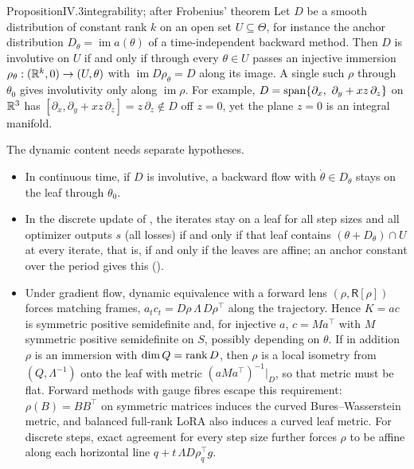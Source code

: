 \begin{restate}{Proposition}{IV.3}{integrability; after Frobenius' theorem}
Let $D$ be a smooth distribution of constant rank $k$ on an open set $U\subseteq\Theta$, for instance the anchor
distribution $D_\theta=\operatorname{im}a(\theta)$ of a time-independent backward method. Then $D$ is involutive on $U$ if
and only if through every $\theta\in U$ passes an injective immersion $\rho_\theta:(\mathbb{R}^k,0)\to(U,\theta)$ with
$\operatorname{im}D\rho_\theta=D$ along its image. A single such $\rho$ through $\theta_0$ gives involutivity only along
$\operatorname{im}\rho$. For example, $D=\spanop\{\partial_x,\ \partial_y+xz\,\partial_z\}$ on $\mathbb{R}^3$ has
$[\partial_x,\partial_y+xz\,\partial_z]=z\,\partial_z\notin D$ off $z=0$, yet the plane $z=0$ is an integral manifold.

The dynamic content needs separate hypotheses.
\begin{itemize}
  \item In continuous time, if $D$ is involutive, a backward flow with $\dot\theta\in D_\theta$ stays on the leaf through
  $\theta_0$.
  \item In the discrete update of , the iterates stay on a leaf for all step sizes and all
  optimizer outputs $s$ (all losses) if and only if that leaf contains $(\theta+D_\theta)\cap U$ at every iterate, that
  is, if and only if the leaves are affine; an anchor constant over the period gives this ().
  \item Under gradient flow, dynamic equivalence with a forward lens $(\rho,\mathsf R[\rho])$ forces matching frames,
  $a_tc_t=D\rho\,\Lambda\,D\rho^\top$ along the trajectory. Hence $K=ac$ is symmetric positive semidefinite and, for
  injective $a$, $c=Ma^\top$ with $M$ symmetric positive semidefinite on $S$, possibly depending on $\theta$. If in
  addition $\rho$ is an immersion with $\dim Q=\operatorname{rank} D$, then $\rho$ is a local isometry from $(Q,\Lambda^{-1})$ onto the
  leaf with metric $(aMa^\top)^{-1}|_D$, so that metric must be flat. Forward methods with gauge fibres escape this
  requirement: $\rho(B)=BB^\top$ on symmetric matrices induces the curved Bures--Wasserstein metric, and balanced
  full-rank LoRA also induces a curved leaf metric. For discrete steps, exact agreement for every step size further
  forces $\rho$ to be affine along each horizontal line $q+t\,\Lambda D\rho_q^\top g$.
\end{itemize}


\end{restate}
